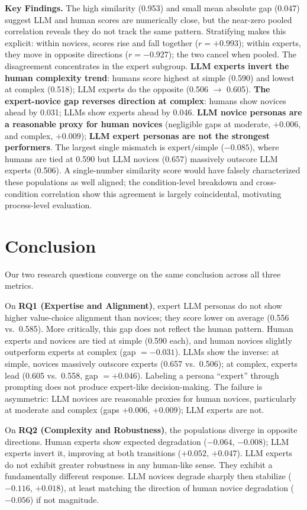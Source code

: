 \documentclass[manuscript,review]{acmart}
\begin{document}
\textbf{Key Findings.} The high similarity (0.953) and small mean absolute gap (0.047) suggest LLM and human scores are numerically close, but the near-zero pooled correlation reveals they do not track the same pattern. Stratifying makes this explicit: within novices, scores rise and fall together ($r=+0.993$); within experts, they move in opposite directions ($r=-0.927$); the two cancel when pooled. The disagreement concentrates in the expert subgroup. \textbf{LLM experts invert the human complexity trend}: humans score highest at simple (0.590) and lowest at complex (0.518); LLM experts do the opposite (0.506 $\rightarrow$ 0.605). \textbf{The expert-novice gap reverses direction at complex}: humans show novices ahead by 0.031; LLMs show experts ahead by 0.046. \textbf{LLM novice personas are a reasonable proxy for human novices} (negligible gaps at moderate, $+0.006$, and complex, $+0.009$); \textbf{LLM expert personas are not the strongest performers}. The largest single mismatch is expert/simple ($-0.085$), where humans are tied at 0.590 but LLM novices (0.657) massively outscore LLM experts (0.506). A single-number similarity score would have falsely characterized these populations as well aligned; the condition-level breakdown and cross-condition correlation show this agreement is largely coincidental, motivating process-level evaluation.

\section{Conclusion}
Our two research questions converge on the same conclusion across all three metrics.

On \textbf{RQ1 (Expertise and Alignment)}, expert LLM personas do not show higher value-choice alignment than novices; they score lower on average (0.556 vs.\ 0.585). More critically, this gap does not reflect the human pattern. Human experts and novices are tied at simple (0.590 each), and human novices slightly outperform experts at complex (gap $= -0.031$). LLMs show the inverse: at simple, novices massively outscore experts (0.657 vs.\ 0.506); at complex, experts lead (0.605 vs.\ 0.558, gap $= +0.046$). Labeling a persona ``expert'' through prompting does not produce expert-like decision-making. The failure is asymmetric: LLM novices are reasonable proxies for human novices, particularly at moderate and complex (gaps $+0.006$, $+0.009$); LLM experts are not.

On \textbf{RQ2 (Complexity and Robustness)}, the populations diverge in opposite directions. Human experts show expected degradation ($-0.064$, $-0.008$); LLM experts invert it, improving at both transitions ($+0.052$, $+0.047$). LLM experts do not exhibit greater robustness in any human-like sense. They exhibit a fundamentally different response. LLM novices degrade sharply then stabilize ($-0.116$, $+0.018$), at least matching the direction of human novice degradation ($-0.056$) if not magnitude.
\end{document}

